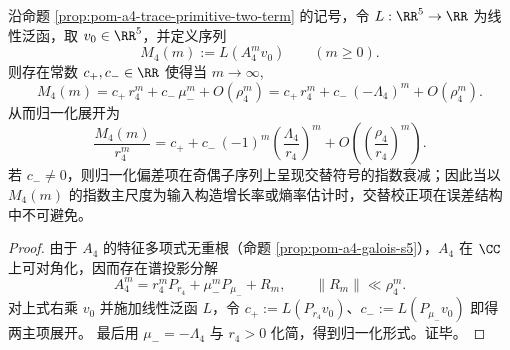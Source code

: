 
\begin{corollary}[负实次谱诱导的线性观测奇偶振荡两主项展开]\label{cor:pom-a4-linear-observable-two-term-oscillation}
沿命题 \ref{prop:pom-a4-trace-primitive-two-term} 的记号，令 \(L:\RR^5\to\RR\) 为线性泛函，取 \(v_0\in\RR^5\)，并定义序列
\[
M_4(m):=L(A_4^m v_0)\qquad (m\ge 0).
\]
则存在常数 \(c_+,c_-\in\RR\) 使得当 \(m\to\infty\),
\[
M_4(m)=c_+\,r_4^m+c_-\,\mu_-^m+O(\rho_4^m)
=c_+\,r_4^m+c_-\,(-\Lambda_4)^m+O(\rho_4^m).
\]
从而归一化展开为
\[
\frac{M_4(m)}{r_4^m}
=c_+ + c_-\,(-1)^m\left(\frac{\Lambda_4}{r_4}\right)^m
+O\!\left(\left(\frac{\rho_4}{r_4}\right)^m\right).
\]
若 \(c_-\neq 0\)，则归一化偏差项在奇偶子序列上呈现交替符号的指数衰减；因此当以 \(M_4(m)\) 的指数主尺度为输入构造增长率或熵率估计时，交替校正项在误差结构中不可避免。
\end{corollary}

\begin{proof}
由于 \(A_4\) 的特征多项式无重根（命题 \ref{prop:pom-a4-galois-s5}），\(A_4\) 在 \(\CC\) 上可对角化，因而存在谱投影分解
\[
A_4^m=r_4^mP_{r_4}+\mu_-^mP_{\mu_-}+R_m,
\qquad
\|R_m\|\ll \rho_4^m.
\]
对上式右乘 \(v_0\) 并施加线性泛函 \(L\)，令 \(c_+:=L(P_{r_4}v_0)\)、\(c_-:=L(P_{\mu_-}v_0)\) 即得两主项展开。
最后用 \(\mu_-=-\Lambda_4\) 与 \(r_4>0\) 化简，得到归一化形式。证毕。
\end{proof}
